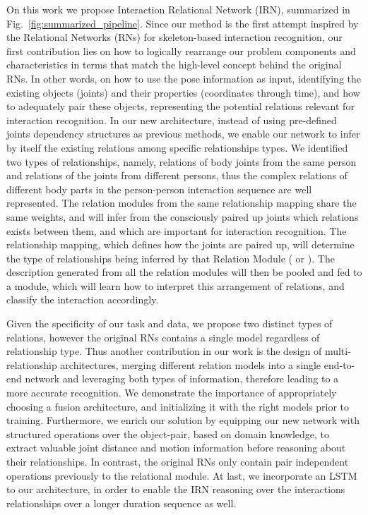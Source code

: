 \documentclass[journal,twoside]{IEEEtran}
\begin{document}
On this work we propose Interaction Relational Network (IRN), summarized in Fig.~\ref{fig:summarized_pipeline}. 
Since our method is the first attempt inspired by the Relational Networks (RNs) for skeleton-based interaction recognition, our first contribution lies on how to logically rearrange our problem components and characteristics in terms that match the high-level concept behind the original RNs. 
In other words, on how to use the pose information as input, identifying the existing objects (joints) and their properties (coordinates through time), and how to adequately pair these objects, representing the potential relations relevant for interaction recognition. 
In our new architecture, instead of using pre-defined joints dependency structures as previous methods, we enable our network to infer by itself the existing relations among specific relationships types.
We identified two types of relationships, namely,  relations of body joints from the same person and  relations of the joints from different persons, thus the complex relations of different body parts in the person-person interaction sequence are well represented. 
The relation modules from the same relationship mapping share the same weights, and will infer from the consciously paired up joints which relations exists between them, and which are important for interaction recognition. 
The relationship mapping, which defines how the joints are paired up, will determine the type of relationships being inferred by that Relation Module ( or ).
The description generated from all the relation modules will then be pooled and fed to a module, which will learn how to interpret this arrangement of relations, and classify the interaction accordingly.

Given the specificity of our task and data, we propose two distinct types of relations, however the original RNs contains a single model regardless of relationship type.
Thus another contribution in our work is the design of multi-relationship architectures, merging different relation models into a single end-to-end network and leveraging both types of information, therefore leading to a more accurate recognition. We demonstrate the importance of appropriately choosing a fusion architecture, and initializing it with the right models prior to training.
Furthermore, we enrich our solution by equipping our new network with structured operations over the object-pair, based on domain knowledge, to extract valuable joint distance and motion information before reasoning about their relationships. In contrast, the original RNs only contain pair independent operations previously to the relational module.
At last, we incorporate an LSTM to our architecture, in order to enable the IRN reasoning over the interactions relationships over a longer duration sequence as well.
\end{document}
